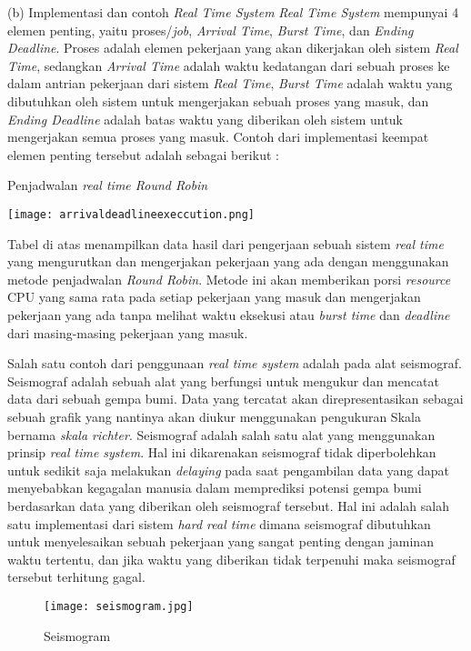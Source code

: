 \documentclass[a4paper,twoside]{article}
\begin{document}
\begin{enumerate}
		(b) Implementasi dan contoh {\it Real Time System}  \newline
		{\it Real Time System} mempunyai 4 elemen penting, yaitu proses/{\it job}, {\it Arrival Time}, {\it Burst Time}, dan {\it Ending Deadline}. Proses adalah elemen pekerjaan yang akan dikerjakan oleh sistem {\it Real Time}, sedangkan {\it Arrival Time} adalah waktu kedatangan dari sebuah proses ke dalam antrian pekerjaan dari sistem {\it Real Time}, {\it Burst Time} adalah waktu yang dibutuhkan oleh sistem untuk mengerjakan sebuah proses yang masuk, dan {\it Ending Deadline} adalah batas waktu yang diberikan oleh sistem untuk mengerjakan semua proses yang masuk.\newline
		Contoh dari implementasi keempat elemen penting tersebut adalah sebagai berikut : \newline
		\begin{center}
        \begin{table}[!htbp]
            \centering
            \caption{Penjadwalan {\it real time Round Robin}}
            \texttt{[image: arrivaldeadlineexeccution.png]}
            \label{}
        \end{table}
		\end{center}
		Tabel di atas menampilkan data hasil dari pengerjaan sebuah sistem {\it real time} yang mengurutkan dan mengerjakan pekerjaan yang ada dengan menggunakan metode penjadwalan {\it Round Robin}. Metode ini akan memberikan porsi {\it resource} CPU yang sama rata pada setiap pekerjaan yang masuk dan mengerjakan pekerjaan yang ada tanpa melihat waktu eksekusi atau {\it burst time} dan {\it deadline} dari masing-masing pekerjaan yang masuk.\newline
	
		Salah satu contoh dari penggunaan {\it real time system} adalah pada alat seismograf. Seismograf adalah sebuah alat yang berfungsi untuk mengukur dan mencatat data dari sebuah gempa bumi. Data yang tercatat akan direpresentasikan sebagai sebuah grafik yang nantinya akan diukur menggunakan pengukuran Skala bernama {\it skala richter}. Seismograf adalah salah satu alat yang menggunakan prinsip {\it real time system}. Hal ini dikarenakan seismograf tidak diperbolehkan untuk sedikit saja melakukan {\it delaying} pada saat pengambilan data yang dapat menyebabkan kegagalan manusia dalam memprediksi potensi gempa bumi berdasarkan data yang diberikan oleh seismograf tersebut. Hal ini adalah salah satu implementasi dari sistem {\it hard real time} dimana seismograf dibutuhkan untuk menyelesaikan sebuah pekerjaan yang sangat penting dengan jaminan waktu tertentu, dan jika waktu yang diberikan tidak terpenuhi maka seismograf tersebut terhitung gagal.\newpage
		\begin{center}
        \begin{figure}
            \centering
            \texttt{[image: seismogram.jpg]}
            \caption{Seismogram}
            \label{}
        \end{figure}
		\end{center}
		

\end{enumerate}
\end{document}
